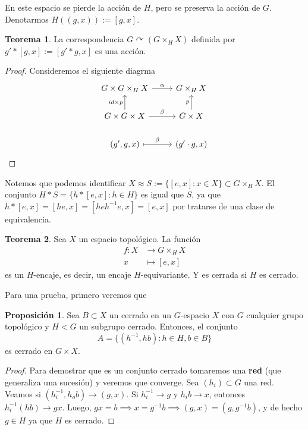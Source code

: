 \documentclass[spanish]{article}
\theoremstyle{definition}
\newtheorem*{teo}{Teorema}
\newtheorem*{prop}{Proposición}
\begin{document}
En este espacio se pierde la acción de $H$, pero se preserva la acción de $G$. Denotarmos $H((g,x)):=[g,x]$.
\begin{teo}
	 La correspondencia $G\curvearrowright(G\times_HX)$ definida por $g'*[g,x]:=[g'*g,x]$ es una acción.
\end{teo}
\begin{proof}
	Consideremos el siguiente diagrma
	\[\begin{tikzcd}
		G\times G\times_H X\arrow[r,"\alpha"]&G\times_HX\\
		G\times G\times X\arrow[u,"id\times p"]\arrow[r,"\beta"]&G\times X\arrow[u,"p"]\\
		(g',g,x)\arrow[r,maps to,"\beta"]&(g'\cdot g,x)
	\end{tikzcd}\]
\end{proof}
Notemos que podemos identificar $X\approx S:=\{[e,x]:x\in X\}\subset G\times_HX$. El conjunto $H* S=\{h*[e,x]:h\in H\}$ es igual que $S$, ya que $h*[e,x]=[he,x]=[heh^{-1}e,x]=[e,x]$ por tratarse de una clase de equivalencia.
\begin{teo}
	Sea $X$ un espacio topológico. La función
	\begin{align*}
		f:X&\to G\times_HX\\
		x&\mapsto[e,x]
	\end{align*}
	es un $H$-encaje, es decir, un encaje $H$-equivariante. Y es cerrada si $H$ es cerrado.
\end{teo}
Para una prueba, primero veremos que
\begin{prop}
	Sea $B\subset X$ un cerrado en un $G$-espacio $X$ con $G$ cualquier grupo topológico y $H<G$ un subgrupo cerrado. Entonces, el conjunto
	\[A=\{(h^{-1},hb):h\in H,b\in B\}\]
	es cerrado en $G\times X$.
\end{prop}
\begin{proof}
	Para demostrar que es un conjunto cerrado tomaremos una \textbf{red} (que generaliza una sucesión) y veremos que converge. Sea $(h_i)\subset G$ una red. Veamos si $(h_i^{-1},h_ob)\to(g,x)$. Si $h_i^{-1}\to g$ y $h_ib\to x$, entonces $h_i^{-1}(hb)\to gx$. Luego, $gx=b\implies x=g^{-1}b\implies(g,x)=(g,g^{-1}b)$, y de hecho $g\in H$ ya que $H$ es cerrado.
\end{proof}
\end{document}
